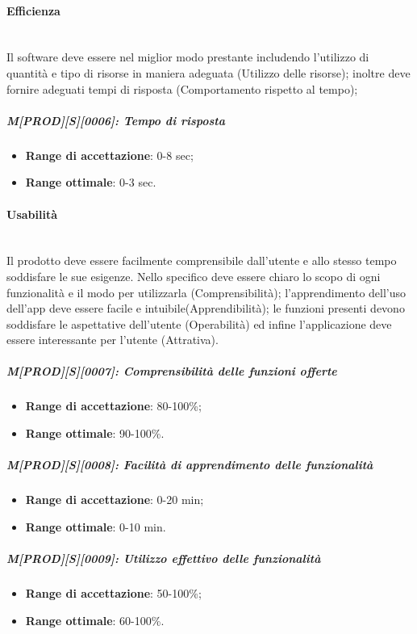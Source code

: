 \paragraph{Efficienza}
~\\
Il software deve essere nel miglior modo prestante includendo l'utilizzo di quantità e tipo di risorse in maniera adeguata (Utilizzo delle risorse); inoltre deve fornire adeguati tempi di risposta (Comportamento rispetto al tempo);
\subparagraph{M[PROD][S][0006]: Tempo di risposta}
\begin{itemize}
    \item \textbf{Range di accettazione}: 0-8 sec;
    \item \textbf{Range ottimale}: 0-3 sec.
\end{itemize}

\paragraph{Usabilità}
~\\
Il prodotto deve essere facilmente comprensibile dall'utente e allo stesso tempo soddisfare le sue esigenze. Nello specifico deve essere chiaro lo scopo di ogni funzionalità e il modo per utilizzarla  (Comprensibilità); l'apprendimento dell'uso dell'app deve essere facile e intuibile(Apprendibilità); le funzioni presenti devono soddisfare le aspettative dell'utente (Operabilità) ed infine l'applicazione deve essere interessante per l'utente (Attrativa). 
\subparagraph{M[PROD][S][0007]: Comprensibilità delle funzioni offerte}
\begin{itemize}
    \item \textbf{Range di accettazione}: 80-100\%;
    \item \textbf{Range ottimale}: 90-100\%.
\end{itemize}
\subparagraph{M[PROD][S][0008]: Facilità di apprendimento delle funzionalità} 
\begin{itemize}
    \item \textbf{Range di accettazione}: 0-20 min;
    \item \textbf{Range ottimale}: 0-10 min.
\end{itemize}
\subparagraph{M[PROD][S][0009]: Utilizzo effettivo delle funzionalità}
\begin{itemize}
\item \textbf{Range di accettazione}: 50-100\%;
\item \textbf{Range ottimale}: 60-100\%.
\end{itemize}


